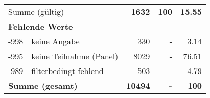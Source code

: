 \begin{longtable}{lXrrr}
     \midrule
     \multicolumn{2}{l}{Summe (gültig)} &
       \textbf{\num{1632}} &
     \textbf{100} &
       \textbf{\num[round-mode=places,round-precision=2]{15,55}} \\
     \multicolumn{5}{l}{\textbf{Fehlende Werte}}\\
       -998 &
       keine Angabe &
         \num{330} &
        - &
         \num[round-mode=places,round-precision=2]{3,14} \\
       -995 &
       keine Teilnahme (Panel) &
         \num{8029} &
        - &
         \num[round-mode=places,round-precision=2]{76,51} \\
       -989 &
       filterbedingt fehlend &
         \num{503} &
        - &
         \num[round-mode=places,round-precision=2]{4,79} \\
     \midrule
     \multicolumn{2}{l}{\textbf{Summe (gesamt)}} &
          \textbf{\num{10494}} &
        \textbf{-} &
        \textbf{100} \\
     \bottomrule
     \end{longtable}
     
